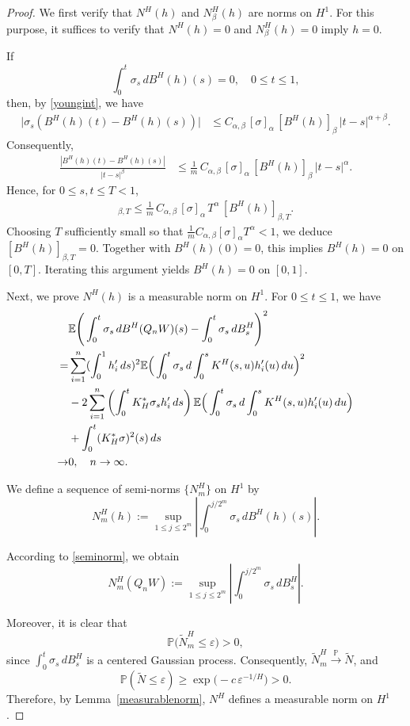 \documentclass[preprint,12pt]{elsarticle}
\theoremstyle{definition}  %
\theoremstyle{plain}  %
\begin{document}
 \begin{proof}
 	We first verify that $N^H(h)$ and $N^H_\beta(h)$ are norms on $H^1$. 
For this purpose, it suffices to verify that $N^H(h)=0$ and $N^H_\beta(h)=0$ imply $h=0$.

If 
\[
\int_0^t \sigma_s \, dB^H(h)(s)=0, \quad 0 \le t \le 1,
\]  
then, by \eqref{youngint}, we have  
\begin{align*}
   \bigl| \sigma_s ( B^H(h)(t) - B^H(h)(s) ) \bigr|
   &\le C_{\alpha,\beta} \, [\sigma]_\alpha \, [B^H(h)]_\beta \, |t-s|^{\alpha+\beta}.
\end{align*}
Consequently,
\begin{align*}
   \frac{|B^H(h)(t) - B^H(h)(s)|}{|t-s|^\beta}
   &\le \frac{1}{m} \, C_{\alpha,\beta} \, [\sigma]_\alpha \, [B^H(h)]_\beta \, |t-s|^\alpha.
\end{align*}
Hence, for $0 \le s,t \le T < 1$,  
\begin{align*}
   [B^H(h)]_{\beta,T} \le \frac{1}{m} \, C_{\alpha,\beta} \, [\sigma]_\alpha \, T^\alpha \, [B^H(h)]_{\beta,T}.
\end{align*}
Choosing $T$ sufficiently small so that $\frac{1}{m} C_{\alpha,\beta} [\sigma]_\alpha T^\alpha < 1$, we deduce $[B^H(h)]_{\beta,T}=0$. 
Together with $B^H(h)(0)=0$, this implies $B^H(h)=0$ on $[0,T]$. Iterating this argument yields $B^H(h)=0$ on $[0,1]$.

Next, we prove $N^H(h)$ is a measurable norm on $H^1$. 
For $0 \le t \le 1$, we have
\begin{align}
\notag
&\mathbb{E}\Bigg(\int_0^t \sigma_s \, dB^H(Q_n W)(s) - \int_0^t \sigma_s \, dB^H_s \Bigg)^2 \\
=& \sum_{i=1}^n (\int_0^1 h_i' \, ds)^2 \mathbb{E} \Big( \int_0^t \sigma_s \, d\int_0^s K^H(s,u) h_i'(u) \, du \Big)^2 \\
\notag
& - 2 \sum_{i=1}^n \left( \int_0^t K_H^* \sigma_s h_i' \, ds \right) \mathbb{E} \Big( \int_0^t \sigma_s \, d\int_0^s K^H(s,u) h_i'(u) \, du \Big) \\
\notag
& + \int_0^t (K_H^* \sigma)^2(s) \, ds \\
\to & 0, \quad n \to \infty. \label{seminorm}
\end{align}

We define a sequence of semi-norms $\{N^H_m\}$ on $H^1$ by
\[
N^H_m(h) := \sup_{1 \le j \le 2^m} \left| \int_0^{j/2^m} \sigma_s \, dB^H(h)(s) \right|.
\]

According to \eqref{seminorm}, we obtain
\[
N^H_m(Q_n W) := \sup_{1 \le j \le 2^m} \left| \int_0^{j/2^m} \sigma_s \, dB^H_s \right|.
\]

Moreover, it is clear that
\[
\mathbb{P}\big( \tilde{N}^H_m \le \varepsilon \big) > 0,
\]
since $\int_0^t \sigma_s \, dB^H_s$ is a centered Gaussian process. 
Consequently, $\tilde{N}^H_m \xrightarrow{\mathbb{P}} \tilde{N}$, and
\[
\mathbb{P}(\tilde{N} \le \varepsilon) \ge \exp\Big( -c \, \varepsilon^{-1/H} \Big) > 0.
\]
Therefore, by Lemma~\ref{measurablenorm}, $N^H$ defines a measurable norm on $H^1$.

	
 \end{proof}
	
\end{document}
